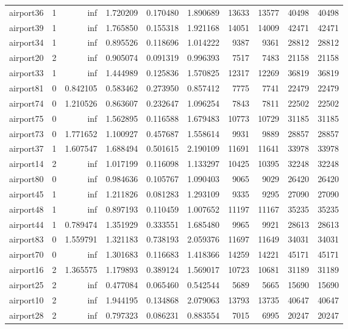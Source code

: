 \begin{longtable}{|l|r|r|r|r|r|r|r|r|r|}
airport36 & 1 & inf & 1.720209 & 0.170480 & 1.890689 & 13633 & 13577 & 40498 & 40498 \\
airport39 & 1 & inf & 1.765850 & 0.155318 & 1.921168 & 14051 & 14009 & 42471 & 42471 \\
airport34 & 1 & inf & 0.895526 & 0.118696 & 1.014222 & 9387 & 9361 & 28812 & 28812 \\
airport20 & 2 & inf & 0.905074 & 0.091319 & 0.996393 & 7517 & 7483 & 21158 & 21158 \\
airport33 & 1 & inf & 1.444989 & 0.125836 & 1.570825 & 12317 & 12269 & 36819 & 36819 \\
airport81 & 0 & 0.842105 & 0.583462 & 0.273950 & 0.857412 & 7775 & 7741 & 22479 & 22479 \\
airport74 & 0 & 1.210526 & 0.863607 & 0.232647 & 1.096254 & 7843 & 7811 & 22502 & 22502 \\
airport75 & 0 & inf & 1.562895 & 0.116588 & 1.679483 & 10773 & 10729 & 31185 & 31185 \\
airport73 & 0 & 1.771652 & 1.100927 & 0.457687 & 1.558614 & 9931 & 9889 & 28857 & 28857 \\
airport37 & 1 & 1.607547 & 1.688494 & 0.501615 & 2.190109 & 11691 & 11641 & 33978 & 33978 \\
airport14 & 2 & inf & 1.017199 & 0.116098 & 1.133297 & 10425 & 10395 & 32248 & 32248 \\
airport80 & 0 & inf & 0.984636 & 0.105767 & 1.090403 & 9065 & 9029 & 26420 & 26420 \\
airport45 & 1 & inf & 1.211826 & 0.081283 & 1.293109 & 9335 & 9295 & 27090 & 27090 \\
airport48 & 1 & inf & 0.897193 & 0.110459 & 1.007652 & 11197 & 11167 & 35235 & 35235 \\
airport44 & 1 & 0.789474 & 1.351929 & 0.333551 & 1.685480 & 9965 & 9921 & 28613 & 28613 \\
airport83 & 0 & 1.559791 & 1.321183 & 0.738193 & 2.059376 & 11697 & 11649 & 34031 & 34031 \\
airport70 & 0 & inf & 1.301683 & 0.116683 & 1.418366 & 14259 & 14221 & 45171 & 45171 \\
airport16 & 2 & 1.365575 & 1.179893 & 0.389124 & 1.569017 & 10723 & 10681 & 31189 & 31189 \\
airport25 & 2 & inf & 0.477084 & 0.065460 & 0.542544 & 5689 & 5665 & 15690 & 15690 \\
airport10 & 2 & inf & 1.944195 & 0.134868 & 2.079063 & 13793 & 13735 & 40647 & 40647 \\
airport28 & 2 & inf & 0.797323 & 0.086231 & 0.883554 & 7015 & 6995 & 20247 & 20247 \\

\end{longtable}
